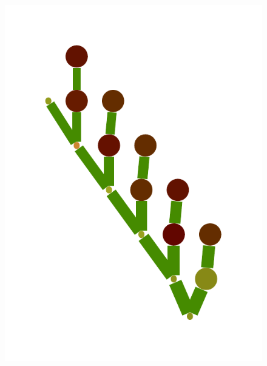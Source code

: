 \documentclass[a4paper,10pt]{article}
\begin{document}
\begin{figure}
{    \includegraphics[scale=.14]{../figures/vector/6-4-vine-induced-6.pdf}
}
\end{figure}
\end{document}
